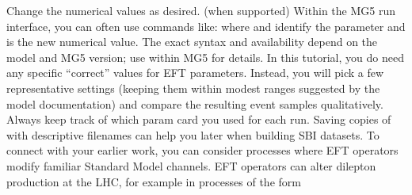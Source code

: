 \markdownRendererUlItem Change the numerical values as desired.\markdownRendererUlItemEnd 
\markdownRendererUlEndTight \markdownRendererOlItemEnd 
{} (when supported)\markdownRendererInterblockSeparator
{}\markdownRendererUlBegin
\markdownRendererUlItem Within the MG5 run interface, you can often use commands like:\markdownRendererInterblockSeparator
{}\markdownRendererInterblockSeparator
{}where  and  identify the parameter and  is the new numerical value.\markdownRendererUlItemEnd 
\markdownRendererUlItem The exact syntax and availability depend on the model and MG5 version; use  within MG5 for details.\markdownRendererUlItemEnd 
\markdownRendererUlEnd \markdownRendererOlItemEnd 
\markdownRendererOlEnd \markdownRendererInterblockSeparator
{}In this tutorial, you do  need any specific “correct” values for EFT parameters. Instead, you will pick a few representative settings (keeping them within modest ranges suggested by the model documentation) and compare the resulting event samples qualitatively.\markdownRendererInterblockSeparator
{}\markdownRendererBlockQuoteBegin
{} Always keep track of which param card you used for each run. Saving copies of  with descriptive filenames can help you later when building SBI datasets.\markdownRendererBlockQuoteEnd \markdownRendererInterblockSeparator
{}\markdownRendererThematicBreak{}\markdownRendererInterblockSeparator
{}
\markdownRendererSectionEnd 
\markdownRendererSectionEnd \markdownRendererSectionBegin
{}\markdownRendererInterblockSeparator
{}To connect with your earlier work, you can consider processes where EFT operators modify familiar Standard Model channels.\markdownRendererInterblockSeparator
{}\markdownRendererSectionBegin
{}\markdownRendererInterblockSeparator
{}EFT operators can alter dilepton production at the LHC, for example in processes of the form\markdownRendererParagraphSeparator
{}\markdownRendererParagraphSeparator
